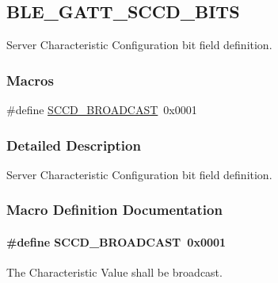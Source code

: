 \hypertarget{group___b_l_e___g_a_t_t___s_c_c_d___b_i_t_s}{}\subsection{B\+L\+E\+\_\+\+G\+A\+T\+T\+\_\+\+S\+C\+C\+D\+\_\+\+B\+I\+TS}
\label{group___b_l_e___g_a_t_t___s_c_c_d___b_i_t_s}


Server Characteristic Configuration bit field definition.  


\subsubsection*{Macros}
\begin{DoxyCompactItemize}
\item 
\#define \hyperlink{group___b_l_e___g_a_t_t___s_c_c_d___b_i_t_s_gaf693e78964ced81e7419dc0e404ae176}{S\+C\+C\+D\+\_\+\+B\+R\+O\+A\+D\+C\+A\+ST}~0x0001
\end{DoxyCompactItemize}


\subsubsection{Detailed Description}
Server Characteristic Configuration bit field definition. 



\subsubsection{Macro Definition Documentation}
\paragraph[{\texorpdfstring{S\+C\+C\+D\+\_\+\+B\+R\+O\+A\+D\+C\+A\+ST}{SCCD_BROADCAST}}]{\setlength{\rightskip}{0pt plus 5cm}\#define S\+C\+C\+D\+\_\+\+B\+R\+O\+A\+D\+C\+A\+ST~0x0001}\hypertarget{group___b_l_e___g_a_t_t___s_c_c_d___b_i_t_s_gaf693e78964ced81e7419dc0e404ae176}{}\label{group___b_l_e___g_a_t_t___s_c_c_d___b_i_t_s_gaf693e78964ced81e7419dc0e404ae176}
The Characteristic Value shall be broadcast. 